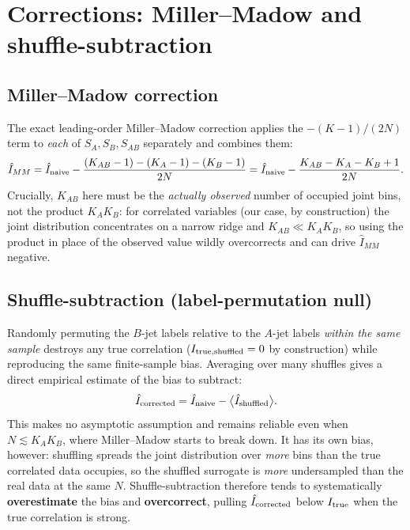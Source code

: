 \documentclass[11pt]{article}
\newcommand{\Itrue}{I_{\rm true}}
\begin{document}
\section{Corrections: Miller--Madow and shuffle-subtraction}
\label{sec:corrections}

\subsection{Miller--Madow correction}

The exact leading-order Miller--Madow correction applies the
$-(K-1)/(2N)$ term to \emph{each} of $S_A,S_B,S_{AB}$ separately and
combines them:
\begin{equation}
\hat I_{MM} = \hat I_{\rm naive} - \frac{(K_{AB}-1)-(K_A-1)-(K_B-1)}{2N}
= \hat I_{\rm naive} - \frac{K_{AB}-K_A-K_B+1}{2N}.
\end{equation}
Crucially, $K_{AB}$ here must be the \emph{actually observed} number of
occupied joint bins, not the product $K_AK_B$: for correlated variables
(our case, by construction) the joint distribution concentrates on a
narrow ridge and $K_{AB}\ll K_AK_B$, so using the product in place of the
observed value wildly overcorrects and can drive $\hat I_{MM}$ negative.

\subsection{Shuffle-subtraction (label-permutation null)}
\label{sec:shuffle}

Randomly permuting the $B$-jet labels relative to the $A$-jet labels
\emph{within the same sample} destroys any true correlation
($I_{\rm true,shuffled}=0$ by construction) while reproducing the same
finite-sample bias. Averaging over many shuffles gives a direct empirical
estimate of the bias to subtract:
\begin{equation}
\hat I_{\rm corrected} = \hat I_{\rm naive} -
\big\langle \hat I_{\rm shuffled}\big\rangle .
\end{equation}
This makes no asymptotic assumption and remains reliable even when
$N\lesssim K_AK_B$, where Miller--Madow starts to break down. It has its
own bias, however: shuffling spreads the joint distribution over
\emph{more} bins than the true correlated data occupies, so the shuffled
surrogate is \emph{more} undersampled than the real data at the same $N$.
Shuffle-subtraction therefore tends to systematically
\textbf{overestimate} the bias and \textbf{overcorrect}, pulling
$\hat I_{\rm corrected}$ below $\Itrue$ when the true correlation is
strong.
\end{document}
